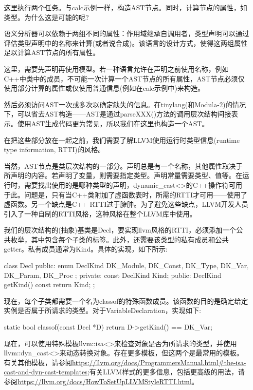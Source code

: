 这里执行两个任务。与calc示例一样，构造AST节点。同时，计算节点的属性，如类型。为什么这是可能的呢?

语义分析器可以依赖于两组不同的属性：作用域继承自调用者，类型声明可以通过评估类型声明中的名称来计算(或者说合成)。该语言的设计方式，使得这两组属性足以计算AST节点的所有属性。

这里，需要先声明再使用模型。若一种语言允许在声明之前使用名称，例如C++中类中的成员，不可能一次计算一个AST节点的所有属性，AST节点必须仅使用部分计算的属性或仅使用普通信息(例如在calc示例中)来构造。

然后必须访问AST一次或多次以确定缺失的信息。在tinylang(和Modula-2)的情况下，可以省去AST构造——AST是通过parseXXX()方法的调用层次结构间接表示。使用AST生成代码更为常见，所以我们在这里也构造一个AST。

在把这些部分放在一起之前，我们需要了解LLVM使用运行时类型信息(runtime type information, RTTI)的风格。


当然，AST节点是类层次结构的一部分。声明总是有一个名称，其他属性取决于所声明的内容。若声明了变量，则需要指定类型。声明常量需要类型、值等。在运行时，需要找出使用的是哪种类型的声明，dynamic\_cast<>的C++操作符可用于此。问题是，只有当C++类附加了虚函数表时，所需的RTTI才可用——使用了虚函数。另一个缺点是C++ RTTI过于臃肿。为了避免这些缺点，LLVM开发人员引入了一种自制的RTTI风格，这种风格在整个LLVM库中使用。

我们的层次结构的(抽象)基类是Decl，要实现llvm风格的RTTI，必须添加一个公共枚举，其中包含每个子类的标签。此外，还需要该类型的私有成员和公共getter。私有成员通常为Kind。具体的实现，如下所示:

\begin{cpp}
class Decl {
public:
    enum DeclKind { DK_Module, DK_Const, DK_Type,
        DK_Var, DK_Param, DK_Proc };
private:
    const DeclKind Kind;
public:
    DeclKind getKind() const { return Kind; }
};
\end{cpp}

现在，每个子类都需要一个名为classof的特殊函数成员。该函数的目的是确定给定实例是否属于所请求的类型。对于VariableDeclaration，实现如下:

\begin{cpp}
static bool classof(const Decl *D) {
    return D->getKind() == DK_Var;
}
\end{cpp}

现在，可以使用特殊模板llvm::isa<>来检查对象是否为所请求的类型，并使用llvm::dyn\_cast<>来动态转换对象。存在更多模板，但这两个是最常用的模板。有关其他模板，请参阅\url{https://llvm.org/docs/ProgrammersManual.html#the-isa-cast-and-dyn-cast-templates};有关LLVM样式的更多信息，包括更高级的用法，请参阅\url{https://llvm.org/docs/HowToSetUpLLVMStyleRTTI.html}。

